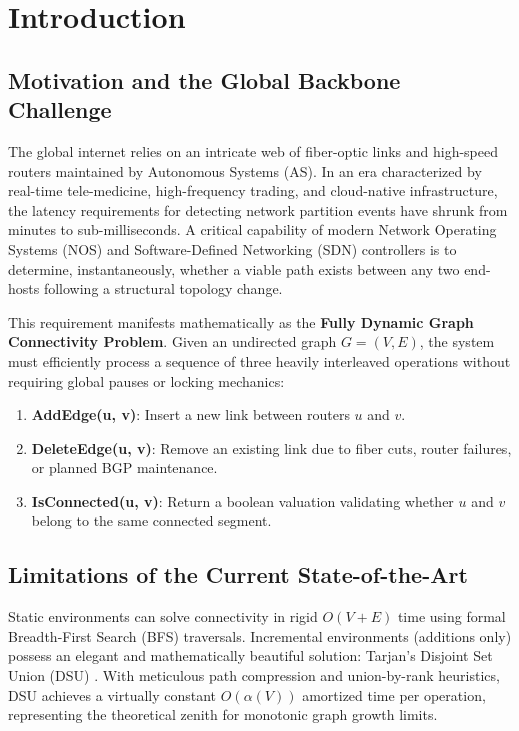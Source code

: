 \documentclass[runningheads]{llncs}
\begin{document}
\section{Introduction}

\subsection{Motivation and the Global Backbone Challenge}
The global internet relies on an intricate web of fiber-optic links and high-speed routers maintained by Autonomous Systems (AS). In an era characterized by real-time tele-medicine, high-frequency trading, and cloud-native infrastructure, the latency requirements for detecting network partition events have shrunk from minutes to sub-milliseconds. A critical capability of modern Network Operating Systems (NOS) and Software-Defined Networking (SDN) controllers is to determine, instantaneously, whether a viable path exists between any two end-hosts following a structural topology change.

This requirement manifests mathematically as the \textbf{Fully Dynamic Graph Connectivity Problem}. Given an undirected graph $G = (V, E)$, the system must efficiently process a sequence of three heavily interleaved operations without requiring global pauses or locking mechanics:
\begin{enumerate}
    \item \textbf{AddEdge(u, v)}: Insert a new link between routers $u$ and $v$.
    \item \textbf{DeleteEdge(u, v)}: Remove an existing link due to fiber cuts, router failures, or planned BGP maintenance.
    \item \textbf{IsConnected(u, v)}: Return a boolean valuation validating whether $u$ and $v$ belong to the same connected segment.
\end{enumerate}

\subsection{Limitations of the Current State-of-the-Art}
Static environments can solve connectivity in rigid $O(V+E)$ time using formal Breadth-First Search (BFS) traversals. Incremental environments (additions only) possess an elegant and mathematically beautiful solution: Tarjan's Disjoint Set Union (DSU) \cite{ref1}. With meticulous path compression and union-by-rank heuristics, DSU achieves a virtually constant $O(\alpha(V))$ amortized time per operation, representing the theoretical zenith for monotonic graph growth limits.
\end{document}
